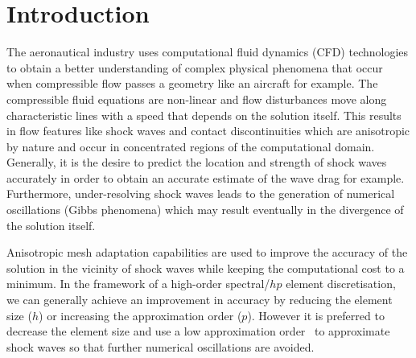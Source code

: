 \documentclass[review]{elsarticle}
\begin{document}
\linenumbers


\section{Introduction}

\par The aeronautical industry uses computational fluid dynamics (CFD) technologies to obtain a better understanding of complex physical phenomena that occur when compressible flow passes a geometry like an aircraft for example.		The compressible fluid equations are non-linear and flow disturbances move along characteristic lines with a speed that depends on the solution itself.	This results in flow features like shock waves and contact discontinuities which are anisotropic by nature and occur in concentrated regions of the computational domain.		
Generally, it is the desire to predict the location and strength of shock waves accurately in order to obtain an accurate estimate of the wave drag for example.	
Furthermore, under-resolving shock waves leads to the generation of numerical oscillations (Gibbs phenomena) which may result eventually in the divergence of the solution itself.


\par Anisotropic mesh adaptation capabilities are used to improve the accuracy of the solution in the vicinity of shock waves while keeping the computational cost to a minimum.	 In the framework of a high-order spectral/$hp$ element discretisation, we can generally achieve an improvement in accuracy by reducing the element size ($h$) or increasing the approximation order ($p$).	 However it is preferred to decrease the element size and use a low approximation order~\cite{Ekelschot2016} to approximate shock waves so that further numerical oscillations are avoided.		
\end{document}
